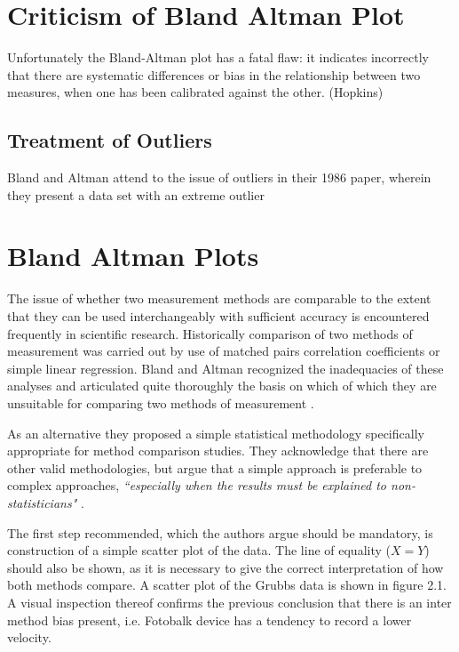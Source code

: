 \documentclass[12pt, a4paper]{report}
\begin{document}
\section{Criticism of Bland Altman Plot}
Unfortunately the Bland-Altman plot has a fatal flaw: it indicates incorrectly that there are systematic differences or bias in the
relationship between two measures, when one has been calibrated against the other. (Hopkins)
\subsection{Treatment of Outliers}
Bland and Altman attend to the issue of outliers in their 1986 paper, wherein they present a data set with an extreme outlier
\section{Bland Altman Plots}
The issue of whether two measurement methods are comparable to the extent that they can be used interchangeably with sufficient
accuracy is encountered frequently in scientific research. Historically comparison of two methods of measurement was carried
out by use of matched pairs correlation coefficients or simple linear regression. Bland and Altman recognized the inadequacies of
these analyses and articulated quite thoroughly the basis on which of which they are unsuitable for comparing two methods of
measurement \citep*{BA83}.

As an alternative they proposed a simple statistical methodology specifically appropriate for method comparison studies. They
acknowledge that there are other valid methodologies, but argue that a simple approach is preferable to complex approaches,
\emph{``especially when the results must be explained to non-statisticians"} \citep*{BA83}.

The first step recommended, which the authors argue should be mandatory, is construction of a simple scatter plot of the data.
The line of equality ($X=Y$) should also be shown, as it is necessary to give the correct interpretation of how both methods
compare. A scatter plot of the Grubbs data is shown in figure 2.1.
A visual inspection thereof confirms the previous conclusion that there is an inter method bias present, i.e. Fotobalk device has a
tendency to record a lower velocity.
\end{document}
